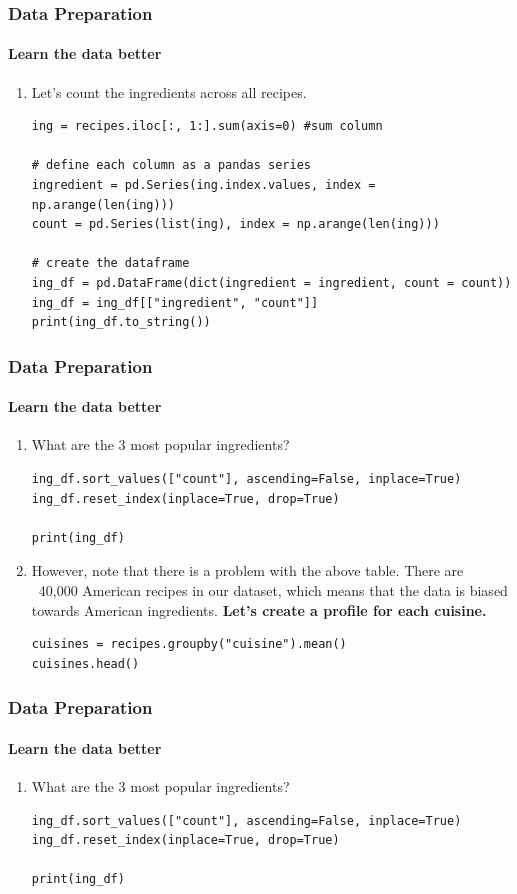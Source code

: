 \documentclass{beamer}
\begin{document}
\begin{frame}[fragile]
	\frametitle{Data Preparation}
	\framesubtitle{Learn the data better}
	\begin{enumerate}
\item Let's count the ingredients across all recipes.
	\begin{lstlisting}
ing = recipes.iloc[:, 1:].sum(axis=0) #sum column
	
# define each column as a pandas series
ingredient = pd.Series(ing.index.values, index = np.arange(len(ing)))
count = pd.Series(list(ing), index = np.arange(len(ing)))

# create the dataframe
ing_df = pd.DataFrame(dict(ingredient = ingredient, count = count))
ing_df = ing_df[["ingredient", "count"]]
print(ing_df.to_string())
\end{lstlisting}
	\end{enumerate}

\end{frame}


\begin{frame}[fragile]
	\frametitle{Data Preparation}
	\framesubtitle{Learn the data better}
	\begin{enumerate}
		\item What are the 3 most popular ingredients?
		\begin{lstlisting}
ing_df.sort_values(["count"], ascending=False, inplace=True)
ing_df.reset_index(inplace=True, drop=True)

print(ing_df)
		\end{lstlisting}
	\item However, note that there is a problem with the above table. There are ~40,000 American recipes in our dataset, which means that the data is biased towards American ingredients. \textbf{Let's create a profile for each cuisine.}
	\begin{lstlisting}
cuisines = recipes.groupby("cuisine").mean()
cuisines.head()
	\end{lstlisting}
	\end{enumerate}
	
\end{frame}



\begin{frame}[fragile]
	\frametitle{Data Preparation}
	\framesubtitle{Learn the data better}
	\begin{enumerate}
		\item What are the 3 most popular ingredients?
		\begin{lstlisting}
ing_df.sort_values(["count"], ascending=False, inplace=True)
ing_df.reset_index(inplace=True, drop=True)
			
print(ing_df)
		\end{lstlisting}
	\end{enumerate}
	
\end{frame}
\end{document}
